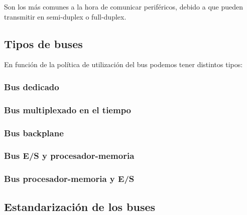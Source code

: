 \documentclass[a4paper, 11pt, titlepage]{article}
\begin{document}
            Son los más comunes a la hora de comunicar periféricos, debido a que pueden transmitir en 
            semi-duplex o full-duplex.

    \subsection{Tipos de buses}

        En función de la política de utilización del bus podemos tener distintos tipos:

        \subsubsection{Bus dedicado}

        \subsubsection{Bus multiplexado en el tiempo}

        \subsubsection{Bus backplane}

        \subsubsection{Bus E/S y procesador-memoria}

        \subsubsection{Bus procesador-memoria y E/S}

    \subsection{Estandarización de los buses}
\end{document}

